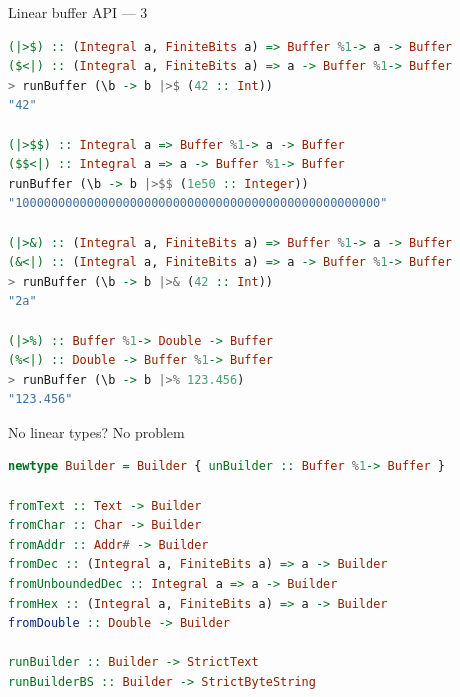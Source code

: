 \documentclass[handout]{beamer}
\begin{document}
\begin{frame}[fragile]{Linear buffer API --- 3}

\small
\begin{lstlisting}[language=Haskell]
(|>$) :: (Integral a, FiniteBits a) => Buffer %1-> a -> Buffer
($<|) :: (Integral a, FiniteBits a) => a -> Buffer %1-> Buffer
> runBuffer (\b -> b |>$ (42 :: Int))
"42"

(|>$$) :: Integral a => Buffer %1-> a -> Buffer
($$<|) :: Integral a => a -> Buffer %1-> Buffer
runBuffer (\b -> b |>$$ (1e50 :: Integer))
"100000000000000000000000000000000000000000000000000"

(|>&) :: (Integral a, FiniteBits a) => Buffer %1-> a -> Buffer
(&<|) :: (Integral a, FiniteBits a) => a -> Buffer %1-> Buffer
> runBuffer (\b -> b |>& (42 :: Int))
"2a"

(|>%) :: Buffer %1-> Double -> Buffer
(%<|) :: Double -> Buffer %1-> Buffer
> runBuffer (\b -> b |>% 123.456)
"123.456"
\end{lstlisting}

\end{frame}

\begin{frame}[fragile]{No linear types? No problem}

\begin{lstlisting}[language=Haskell]
newtype Builder = Builder { unBuilder :: Buffer %1-> Buffer }

fromText :: Text -> Builder
fromChar :: Char -> Builder
fromAddr :: Addr# -> Builder
fromDec :: (Integral a, FiniteBits a) => a -> Builder
fromUnboundedDec :: Integral a => a -> Builder
fromHex :: (Integral a, FiniteBits a) => a -> Builder
fromDouble :: Double -> Builder

runBuilder :: Builder -> StrictText
runBuilderBS :: Builder -> StrictByteString
\end{lstlisting}

\end{frame}
\end{document}
